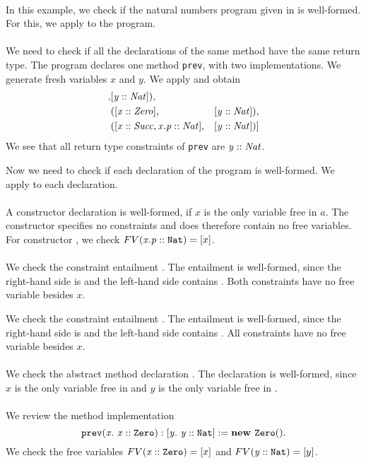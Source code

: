 \begin{example}\quad\\
\label{ex:wf-naturalnumbers}
In this example, we check if the natural numbers program
given in  is well-formed.
For this, we apply  to the program.\\
\\
We need to check if all the declarations
of the same method have the same return type.
The program declares one method \texttt{prev},
with two implementations.
We generate fresh variables $x$ and $y$.
We apply 
and obtain
\begin{align*}
[
  &([\instOf{x}{Nat}], &[\instOf{y}{Nat}]),\\
  &([\instOf{x}{Zero}], &[\instOf{y}{Nat}]),\\
  &([\instOf{x}{Succ}, \instOf{x.p}{Nat}], &[\instOf{y}{Nat}])
]
\end{align*}
We see that all return type constraints of \texttt{prev} are $\mathit{y} :: \mathit{Nat}$.

Now we need to check if each declaration of the program is well-formed.
We apply  to each declaration.\\
\\
A constructor declaration  is well-formed,
if $x$ is the only variable free in $a$.
The constructor 
specifies no constraints and does therefore contain no free variables.
For constructor ,
we check $FV(\mathit{x.p} :: \mathit{\texttt{Nat}}) = [x]$.\\
\\
We check the constraint entailment .
The entailment is well-formed, since the right-hand side is 
and the left-hand side contains .
Both constraints have no free variable besides $x$.

We check the constraint entailment .
The entailment is well-formed, since the right-hand side is 
and the left-hand side contains .
All constraints have no free variable besides $x$.\\
\\
We check the abstract method declaration
.
The declaration is well-formed,
since $x$ is the only variable free in 
and $y$ is the only variable free in .\\
\\
We review the method implementation
\[
  \mathit{\texttt{prev}}(\mathit{x}.\ \mathit{\mathit{x} :: \mathit{\texttt{Zero}}}): \mathit{[y.\ \mathit{\mathit{y} :: \mathit{\texttt{Nat}}}]} := \mathit{\textbf{new } \mathit{\texttt{Zero}}()}.
\]
We check the free variables
$FV(\mathit{x} :: \mathit{\texttt{Zero}}) = [x]$
and
$FV(\mathit{y} :: \mathit{\texttt{Nat}}) = [y]$.


\end{example}
